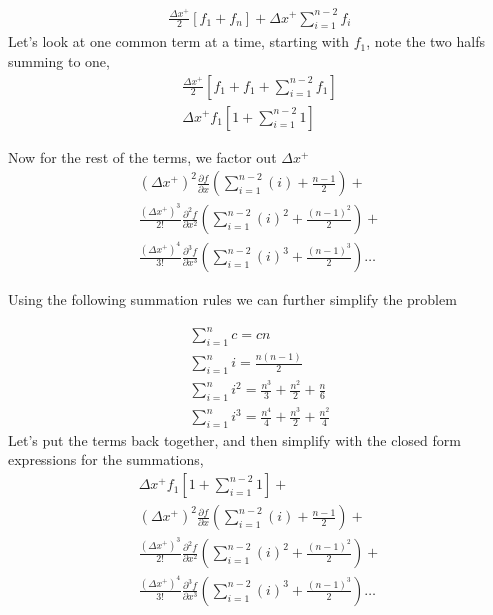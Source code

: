 \documentclass[12pt]{article}
\begin{document}
\begin{align*}
    \frac{\Delta x^+ }{2}\left[ f_1 + f_n \right] + \Delta x^+ \sum_{i=1}^{n-2} f_i 
\end{align*}
Let's look at one common term at a time, starting with $f_1$, note the two halfs
summing to one,
\begin{align*} \frac{\Delta x^+}{2}\left[ f_1 + f_1 + \sum_{i=1}^{n-2} f_1 \right] \\
    \Delta x^+ f_1\left[ 1 + \sum_{i=1}^{n-2}1 \right]
\end{align*}

Now for the rest of the terms, we factor out $\Delta x^+$
\begin{align*}
    (\Delta x^+)^2 \frac{\partial f}{\partial x } \left(
        \sum_{i = 1}^{n - 2} \left( i\right) + \frac{n-1}{2} \right) + \\
        \frac{(\Delta x^+)^3}{2!} \frac{\partial^2 f}{\partial x^2 } \left(
    \sum_{i = 1}^{n - 2} \left( i\right)^2 + \frac{(n-1)^2}{2} \right)  + \\
    \frac{(\Delta x^+)^4}{3!} \frac{\partial^3 f}{\partial x^3 } \left(
    \sum_{i = 1}^{n - 2} \left( i\right)^3 + \frac{(n-1)^3}{2} \right) \dots
\end{align*}

Using the following summation rules we can further simplify the problem


\begin{align*}
    \sum_{i = 1}^{n}c= cn  \\
    \sum_{i = 1}^{n}i =  \frac{n\left( n-1\right)}{2}  \\
    \sum_{i = 1}^{n}i^2  = \frac{n^3}{3} + \frac{n^2}{2} + \frac{n}{6}   \\
    \sum_{i = 1}^{n}i^3  = \frac{n^4}{4} + \frac{n^3}{2} + \frac{n^2}{4}  
\end{align*}
Let's put the terms back together, and then simplify with the closed form 
expressions for the summations,
\begin{align*}
    \Delta x^+ f_1\left[ 1 + \sum_{i=1}^{n-2}1 \right] + \\
    (\Delta x^+)^2 \frac{\partial f}{\partial x } \left(
        \sum_{i = 1}^{n - 2} \left( i\right) + \frac{n-1}{2} \right) + \\
        \frac{(\Delta x^+)^3}{2!} \frac{\partial^2 f}{\partial x^2 } \left(
    \sum_{i = 1}^{n - 2} \left( i\right)^2 + \frac{(n-1)^2}{2} \right)  + \\
    \frac{(\Delta x^+)^4}{3!} \frac{\partial^3 f}{\partial x^3 } \left(
    \sum_{i = 1}^{n - 2} \left( i\right)^3 + \frac{(n-1)^3}{2} \right) \dots
\end{align*}
\end{document}
